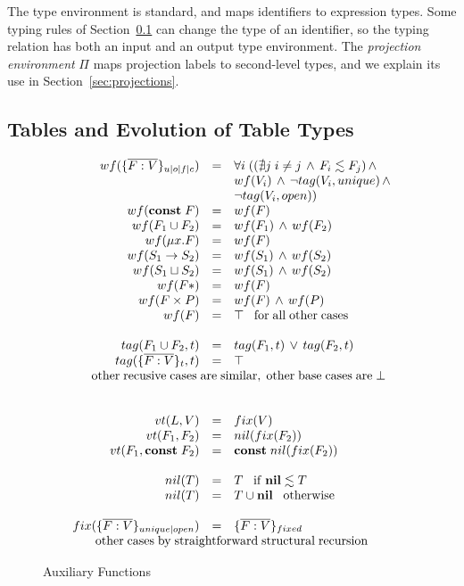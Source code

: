 \documentclass[10pt]{sigplanconf}
\newcommand{\Nil}{\mathbf{nil}}
\begin{document}
The type environment is standard, and maps
identifiers to expression types. Some typing rules of
Section~\ref{sec:tables} can change the type of an identifier,
so the typing relation has both an input and an output type
environment. The {\em projection environment} $\Pi$ maps projection labels to second-level types, and we explain
its use in Section~\ref{sec:projections}.

\subsection{Tables and Evolution of Table Types}
\label{sec:tables}

\begin{figure}
	{\footnotesize
	\[
	\begin{array}{rcl}
	wf(\{\overline{F:V}\}_{u|o|f|c}) & = &
	 \forall i \; ((\nexists j \; i \not= j \,\wedge\, F_{i} \lesssim F_{j}) \,\wedge \\
	 & &  wf(V_{i}) \,\wedge\, \lnot tag(V_{i},unique) \,\wedge\\
	 & &  \lnot tag(V_{i},open))\\
	wf({\bf const}\; F) & = & wf(F) \\
	wf(F_1 \cup F_2) & = & wf(F_1) \,\wedge\, wf(F_2) \\
	wf(\mu x.F) & = & wf(F) \\
	wf(S_1 \rightarrow S_2) & = & wf(S_1) \,\wedge\, wf(S_2) \\
	wf(S_1 \sqcup S_2) & = & wf(S_1) \,\wedge\, wf(S_2)\\
	wf(F{*}) &=& wf(F) \\
	wf(F \times P) &=& wf(F) \,\wedge\,wf(P)\\
	wf(F) & = & \top \;\;\;\mathrm{for\; all\; other\; cases}\\\\
	tag(F_1 \cup F_2, t) & = & tag(F_1, t) \,\vee\, tag(F_2,t) \\
	tag(\{\overline{F:V}\}_t, t) & = & \top\\
	\multicolumn{3}{c}{
		\;\;\;\;\mathrm{other\;recusive\;cases\;are\;similar,\;other\;base\;cases\;are\;}\bot}\\
\\\\
    vt(L, V) & = & fix(V) \\
    vt(F_1, F_2) & = & nil(fix(F_2))\\
    vt(F_1, {\bf const}\;F_2) & = & {\bf const}\;nil(fix(F_2))\\\\
    nil(T) & = & T \;\;\; \mathrm{if}\;\Nil \lesssim T\\
    nil(T) & = & T \cup \Nil \;\;\; \mathrm{otherwise}\\\\
	fix(\{\overline{F:V}\}_{unique|open}) & = &
	\{\overline{F:V}\}_{fixed}\\
	\multicolumn{3}{c}{\mathrm{other\;cases\;by\;straightforward\;structural\;recursion}}
	\end{array}
	\]}
	\caption{Auxiliary Functions}
\label{fig:funcs}
\end{figure}
\end{document}
